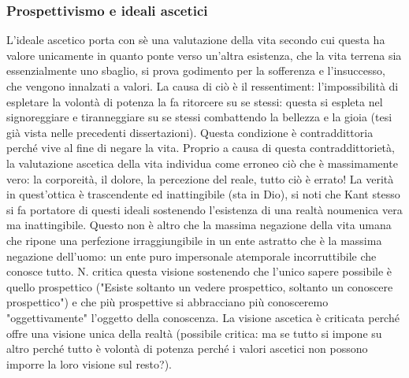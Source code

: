 \documentclass[10pt,a4paper]{article}
\begin{document}
\subsubsection{Prospettivismo e ideali ascetici}
L'ideale ascetico porta con sè una valutazione della vita secondo cui questa ha valore unicamente in quanto ponte verso un'altra esistenza, che la vita terrena sia essenzialmente uno sbaglio, si prova godimento per la sofferenza e l'insuccesso, che vengono innalzati a valori. La causa di ciò è il ressentiment: l'impossibilità di espletare la volontà di potenza la fa ritorcere su se stessi: questa si espleta nel signoreggiare e tiranneggiare su se stessi combattendo la bellezza e la gioia (tesi già vista nelle precedenti dissertazioni). Questa condizione è contraddittoria perché vive al fine di negare la vita. Proprio a causa di questa contraddittorietà, la valutazione ascetica della vita individua come erroneo ciò che è massimamente vero: la corporeità, il dolore, la percezione del reale, tutto ciò è errato! La verità in quest'ottica è trascendente ed inattingibile (sta in Dio), si noti che Kant stesso si fa portatore di questi ideali sostenendo l'esistenza di una realtà noumenica vera ma inattingibile. Questo non è altro che la massima negazione della vita umana che ripone una perfezione irraggiungibile in un ente astratto che è la massima negazione dell'uomo: un ente puro impersonale atemporale incorruttibile che conosce tutto. N. critica questa visione sostenendo che l'unico sapere possibile è quello prospettico ("Esiste soltanto un vedere prospettico, soltanto un conoscere prospettico") e che più prospettive si abbracciano più conosceremo "oggettivamente" l'oggetto della conoscenza. La visione ascetica è criticata perché offre una visione unica della realtà (possibile critica: ma se tutto si impone su altro perché tutto è volontà di potenza perché i valori ascetici non possono imporre la loro visione sul resto?).
\end{document}
